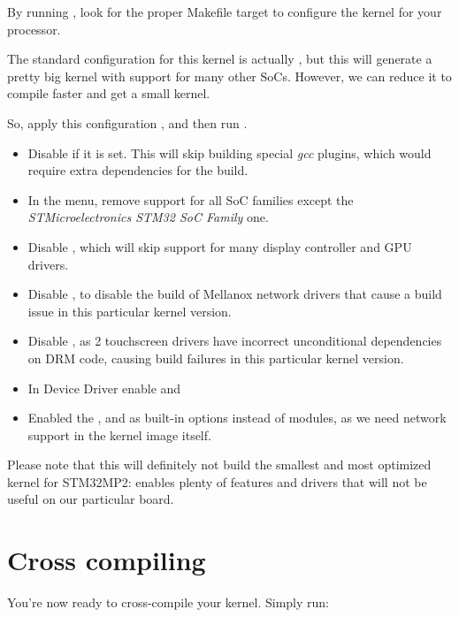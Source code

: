 By running , look for the proper Makefile target to
configure the kernel for your processor.

The standard configuration for this kernel is actually ,
but this will generate a pretty big kernel with support for many other
SoCs. However, we can reduce it to compile faster and get a small
kernel.

So, apply this configuration , and then run .


\begin{itemize}

\item Disable  if it is set. This will skip
  building special {\em gcc} plugins, which would require extra dependencies
  for the build.
\item In the  menu, remove support for all
  SoC families except the {\em STMicroelectronics STM32 SoC Family}
  one.
\item Disable , which will skip support for many
  display controller and GPU drivers.
\item Disable , to disable the
  build of Mellanox network drivers that cause a build issue in this
  particular kernel version.
\item Disable , as 2 touchscreen
  drivers have incorrect unconditional dependencies on DRM code,
  causing build failures in this particular kernel version.
\item In Device Driver enable  and
\item Enabled the ,
   and  as
  built-in options instead of modules, as we need network support in
  the kernel image itself.
\end{itemize}

Please note that this will definitely not build the smallest and most
optimized kernel for STM32MP2:  enables plenty of
features and drivers that will not be useful on our particular board.

\section{Cross compiling}

You're now ready to cross-compile your kernel. Simply run:

